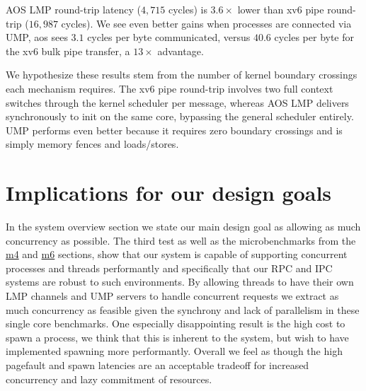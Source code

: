 AOS LMP round-trip latency ($4{,}715$ cycles) is $3.6\times$ lower than xv6 pipe
round-trip ($16{,}987$ cycles). We see even better gains when processes are connected 
via UMP, aos sees $3.1$ cycles per byte communicated, versus $40.6$ cycles per byte for the xv6 bulk pipe transfer, a
$13\times$ advantage. \newline

\noindent We hypothesize these results stem from the number of kernel boundary crossings each
mechanism requires. The xv6 pipe round-trip involves two full context switches through
the kernel scheduler per message, whereas AOS LMP delivers synchronously to init on the
same core, bypassing the general scheduler entirely. UMP performs even better because it
requires zero boundary crossings and is simply memory fences and loads/stores.

\section{Implications for our design goals}
In the system overview section we state our main design goal as allowing as much concurrency
as possible. The third test as well as the microbenchmarks from the \hyperref[sec:performance-opt]{m4} and \hyperref[sec:ump-concurrent]{m6} sections,
show that our system is capable of supporting concurrent processes and threads performantly and
specifically that our RPC and IPC systems are robust to such environments. By allowing threads to have 
their own LMP channels and UMP servers to handle concurrent requests we extract as much
concurrency as feasible given the synchrony and lack of parallelism in these single core benchmarks. One especially disappointing 
result is the high cost to spawn a process, we think that this is inherent to the system, but wish to have
implemented spawning more performantly. Overall we feel as though the high pagefault and spawn latencies
are an acceptable tradeoff for increased concurrency and lazy commitment of resources.